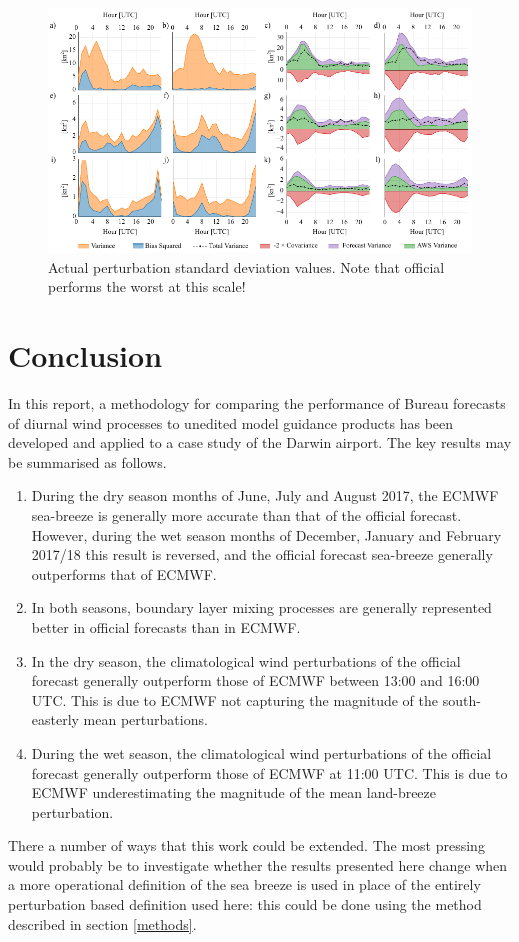 \documentclass[alpha-refs]{wiley-article}
\begin{document}
\begin{figure}
\centering
\includegraphics{error_decomp.pdf}
\caption{Actual perturbation standard deviation values. Note that official performs the worst at this scale!}
\label{Fig:airport_wpi}
\end{figure}

\section{Conclusion}
\label{conclusion}
In this report, a methodology for comparing the performance of Bureau forecasts of diurnal wind processes to unedited model guidance products has been developed and applied to a case study of the Darwin airport. The key results may be summarised as follows.
\begin{enumerate}
\item
During the dry season months of June, July and August 2017, the ECMWF sea-breeze is generally more accurate than that of the official forecast. However, during the wet season months of December, January and February 2017/18 this result is reversed, and the official forecast sea-breeze generally outperforms that of ECMWF. 
\item
In both seasons, boundary layer mixing processes are generally represented better in official forecasts than in ECMWF.
\item
In the dry season, the climatological wind perturbations of the official forecast generally outperform those of ECMWF between 13:00 and 16:00 UTC. This is due to ECMWF not capturing the magnitude of the south-easterly mean perturbations. 
\item
During the wet season, the climatological wind perturbations of the official forecast generally outperform those of ECMWF at 11:00 UTC. This is due to ECMWF underestimating the magnitude of the mean land-breeze perturbation.
\end{enumerate}

There a number of ways that this work could be extended. The most pressing would probably be to investigate whether the results presented here change when a more operational definition of the sea breeze is used in place of the entirely perturbation based definition used here: this could be done using the method described in section \ref{methods}.


\end{document}
